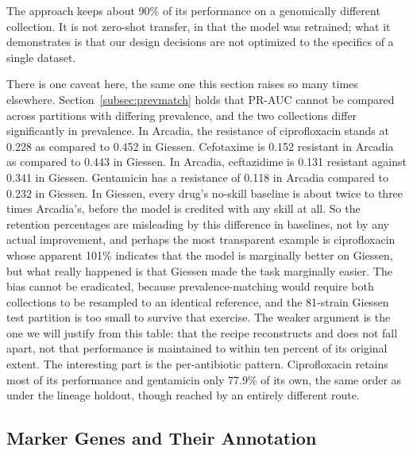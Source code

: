 \documentclass[journal]{IEEEtran}
\begin{document}
The approach keeps about 90\% of its performance on a genomically different
collection. It is not zero-shot transfer, in that the model was retrained; what it
demonstrates is that our design decisions are not optimized to the specifics of a
single dataset.

There is one caveat here, the same one this section raises so many times elsewhere.
Section~\ref{subsec:prevmatch} holds that PR-AUC cannot be compared across partitions
with differing prevalence, and the two collections differ significantly in
prevalence. In Arcadia, the resistance of ciprofloxacin stands at 0.228 as compared
to 0.452 in Giessen. Cefotaxime is 0.152 resistant in Arcadia as compared to 0.443 in
Giessen. In Arcadia, ceftazidime is 0.131 resistant against 0.341 in Giessen.
Gentamicin has a resistance of 0.118 in Arcadia compared to 0.232 in Giessen. In
Giessen, every drug's no-skill baseline is about twice to three times Arcadia's,
before the model is credited with any skill at all. So the retention percentages are
misleading by this difference in baselines, not by any actual improvement, and
perhaps the most transparent example is ciprofloxacin whose apparent 101\% indicates
that the model is marginally better on Giessen, but what really happened is that
Giessen made the task marginally easier. The bias cannot be eradicated, because
prevalence-matching would require both collections to be resampled to an identical
reference, and the 81-strain Giessen test partition is too small to survive that
exercise. The weaker argument is the one we will justify from this table: that the
recipe reconstructs and does not fall apart, not that performance is maintained to
within ten percent of its original extent. The interesting part is the per-antibiotic
pattern. Ciprofloxacin retains most of its performance and gentamicin only 77.9\% of
its own, the same order as under the lineage holdout, though reached by an entirely
different route.

\subsection{Marker Genes and Their Annotation}
\label{subsec:markers}
\end{document}

